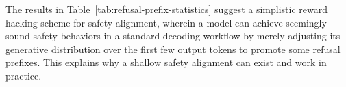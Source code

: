 



















The results in Table~\ref{tab:refusal-prefix-statistics} suggest a simplistic reward hacking scheme for safety alignment, wherein a model can achieve seemingly sound safety behaviors in a standard decoding workflow by merely adjusting its generative distribution over the first few output tokens to promote some refusal prefixes. This explains why a shallow safety alignment can exist and work in practice.


